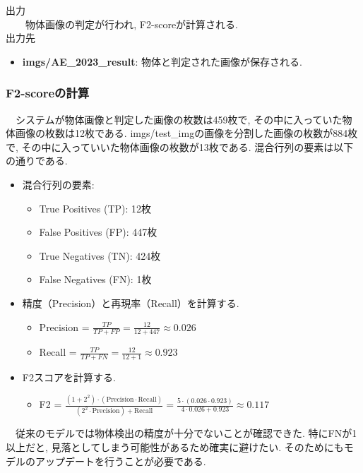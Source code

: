 \documentclass[a4paper, 12pt]{report}
\begin{document}
出力\\
　　物体画像の判定が行われ, F2-scoreが計算される. \\

出力先
\begin{itemize}
    \item \textbf{imgs/AE\_2023\_result}: 物体と判定された画像が保存される. 
\end{itemize}


\subsubsection{F2-scoreの計算}
　システムが物体画像と判定した画像の枚数は459枚で, その中に入っていた物体画像の枚数は12枚である. imgs/test\_imgの画像を分割した画像の枚数が884枚で, その中に入っていいた物体画像の枚数が13枚である. 混合行列の要素は以下の通りである. 
\begin{itemize}
    \item 混合行列の要素:
        \begin{itemize}
            \item True Positives (TP): 12枚
            \item False Positives (FP): 447枚
            \item True Negatives (TN): 424枚
            \item False Negatives (FN): 1枚
        \end{itemize}
        \item 精度（Precision）と再現率（Recall）を計算する. 
        \begin{itemize}
            \item Precision = \(\frac{TP}{TP + FP} = \frac{12}{12 + 447} \approx 0.026\)
            \item Recall = \(\frac{TP}{TP + FN} = \frac{12}{12 + 1} \approx 0.923\)
        \end{itemize}
    \item F2スコアを計算する. 
        \begin{itemize}
            \item F2 = \(\frac{(1 + 2^2) \cdot (\text{Precision} \cdot \text{Recall})}{(2^2 \cdot \text{Precision}) + \text{Recall}} = \frac{5 \cdot (0.026 \cdot 0.923)}{4 \cdot 0.026 + 0.923} \approx 0.117\)
        \end{itemize}
\end{itemize}
　従来のモデルでは物体検出の精度が十分でないことが確認できた. 特にFNが1以上だと, 見落としてしまう可能性があるため確実に避けたい. そのためにもモデルのアップデートを行うことが必要である. 
\end{document}
